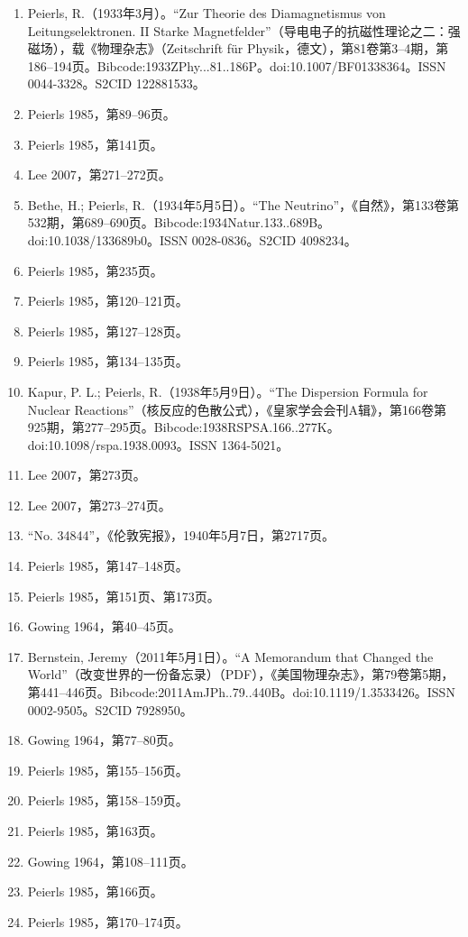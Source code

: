 \begin{enumerate}
\item Peierls, R.（1933年3月）。“Zur Theorie des Diamagnetismus von Leitungselektronen. II Starke Magnetfelder”（导电电子的抗磁性理论之二：强磁场），载《物理杂志》（Zeitschrift für Physik，德文），第81卷第3–4期，第186–194页。Bibcode:1933ZPhy...81..186P。doi:10.1007/BF01338364。ISSN 0044-3328。S2CID 122881533。
\item Peierls 1985，第89–96页。
\item Peierls 1985，第141页。
\item Lee 2007，第271–272页。
\item Bethe, H.; Peierls, R.（1934年5月5日）。“The Neutrino”，《自然》，第133卷第532期，第689–690页。Bibcode:1934Natur.133..689B。doi:10.1038/133689b0。ISSN 0028-0836。S2CID 4098234。
\item Peierls 1985，第235页。
\item Peierls 1985，第120–121页。
\item Peierls 1985，第127–128页。
\item Peierls 1985，第134–135页。
\item Kapur, P. L.; Peierls, R.（1938年5月9日）。“The Dispersion Formula for Nuclear Reactions”（核反应的色散公式），《皇家学会会刊A辑》，第166卷第925期，第277–295页。Bibcode:1938RSPSA.166..277K。doi:10.1098/rspa.1938.0093。ISSN 1364-5021。
\item Lee 2007，第273页。
\item Lee 2007，第273–274页。
\item “No. 34844”，《伦敦宪报》，1940年5月7日，第2717页。
\item Peierls 1985，第147–148页。
\item Peierls 1985，第151页、第173页。
\item Gowing 1964，第40–45页。
\item Bernstein, Jeremy（2011年5月1日）。“A Memorandum that Changed the World”（改变世界的一份备忘录）（PDF），《美国物理杂志》，第79卷第5期，第441–446页。Bibcode:2011AmJPh..79..440B。doi:10.1119/1.3533426。ISSN 0002-9505。S2CID 7928950。
\item Gowing 1964，第77–80页。
\item Peierls 1985，第155–156页。
\item Peierls 1985，第158–159页。
\item Peierls 1985，第163页。
\item Gowing 1964，第108–111页。
\item Peierls 1985，第166页。
\item Peierls 1985，第170–174页。

\end{enumerate}

